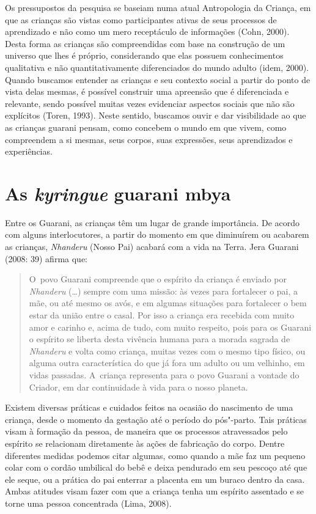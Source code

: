 Os pressupostos da pesquisa se baseiam numa atual Antropologia da
Criança, em que as crianças são vistas como participantes ativas de
seus processos de aprendizado e não como um mero receptáculo de
informações (Cohn, 2000). Desta forma as crianças são compreendidas com
base na construção de um universo que lhes é próprio, considerando que
elas possuem conhecimentos qualitativa e não quantitativamente
diferenciados do mundo adulto (idem, 2000). Quando buscamos entender as
crianças e seu contexto social a partir do ponto de vista delas mesmas,
é possível construir uma apreensão que é diferenciada e relevante,
sendo possível muitas vezes evidenciar aspectos sociais que não são
explícitos (Toren, 1993). Neste sentido, buscamos ouvir e dar
visibilidade ao que as crianças guarani pensam, como concebem o mundo
em que vivem, como compreendem a si mesmas, seus corpos, suas
expressões, seus aprendizados e experiências. 

\section{As \emph{kyringue} guarani mbya}
Entre os Guarani, as crianças têm um lugar de grande importância. De
acordo com alguns interlocutores, a partir do momento em que diminuírem
ou acabarem as crianças, \emph{Nhanderu} (Nosso Pai) acabará com a vida na
Terra. Jera Guarani (2008: 39) afirma que:

\begin{quote}
\noindent
O~povo Guarani compreende que o espírito da criança é enviado por
\emph{Nhanderu} (\ldots{}) sempre com uma missão: às vezes para fortalecer o pai, a
mãe, ou até mesmo os avós, e em algumas situações para fortalecer o bem
estar da união entre o casal. Por isso a criança era recebida com muito
amor e carinho e, acima de tudo, com muito respeito, pois para os
Guarani o espírito se liberta desta vivência humana para a morada
sagrada de \emph{Nhanderu} e volta como criança, muitas vezes com o mesmo tipo
físico, ou alguma outra característica do que já fora um adulto ou um
velhinho, em vidas passadas. A~criança representa para o povo Guarani a
vontade do Criador, em dar continuidade à vida para o nosso planeta.
\end{quote}

Existem diversas práticas e cuidados feitos na ocasião do nascimento de
uma criança, desde o momento da gestação até o período do pós"-parto.
Tais práticas visam à formação da pessoa, de maneira que os processos
atravessados pelo espírito se relacionam diretamente às ações de
fabricação do corpo. Dentre diferentes medidas podemos citar algumas,
como quando a mãe faz um pequeno colar com o cordão umbilical do bebê e
deixa pendurado em seu pescoço até que ele seque, ou a prática do pai
enterrar a placenta em um buraco dentro da casa. Ambas atitudes visam
fazer com que a criança tenha um espírito assentado e se torne uma
pessoa concentrada (Lima, 2008).


